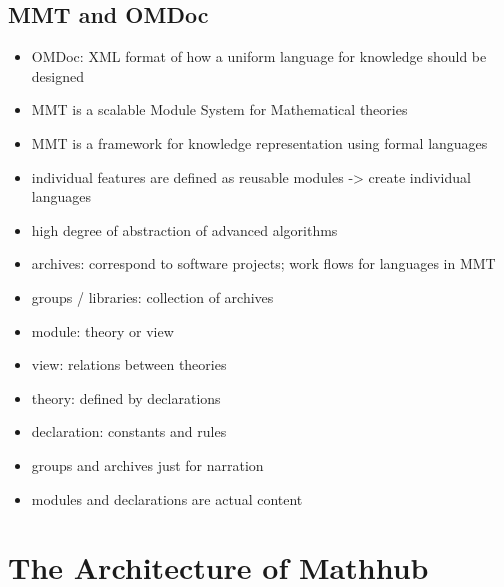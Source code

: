 \documentclass[11pt,a4paper]{article}
\begin{document}
\subsection{MMT and OMDoc}
\begin{itemize}
\item OMDoc: XML format of how a uniform language for knowledge should be designed
\item MMT is a scalable Module System for Mathematical theories
\item MMT is a framework for knowledge representation using formal languages
\item individual features are defined as reusable modules -> create individual languages
\item high degree of abstraction of advanced algorithms
\item archives: correspond to software projects; work flows for languages in MMT
\item groups / libraries: collection of archives
\item module: theory or view
\item view: relations between theories
\item theory: defined by declarations
\item declaration: constants and rules
\item groups and archives just for narration
\item modules and declarations are actual content
\cite{mmt}
\end{itemize}
 
\section{The Architecture of Mathhub}
\end{document}
